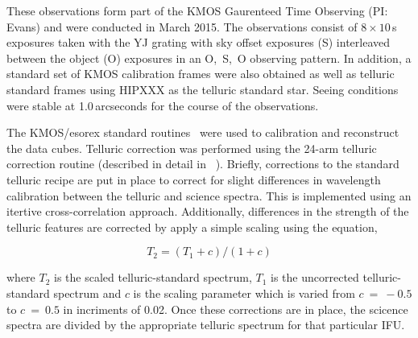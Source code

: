 \documentclass[useAMS,usenatbib]{mn2e}
\begin{document}
These observations form part of the KMOS Gaurenteed Time Observing (PI: Evans) and were conducted in March 2015.
The observations consist of $8\times10$\,s exposures taken with the YJ grating with sky offset exposures (S) interleaved between the object (O) exposures in an O,~S,~O observing pattern.
In addition, a standard set of KMOS calibration frames were also obtained as well as telluric standard frames using HIPXXX as the telluric standard star.
Seeing conditions were stable at 1.0\,arcseconds for the course of the observations.

The KMOS/esorex standard routines~\citep[SPARK;]{2013A&A...558A..56D} were used to calibration and reconstruct the data cubes.
Telluric correction was performed using the 24-arm telluric correction routine (described in detail in ~\cite{2015ApJ...803...14P}).
Briefly, corrections to the standard telluric recipe are put in place to correct for slight differences in wavelength calibration between the telluric and science spectra.
This is implemented using an itertive cross-correlation approach.
Additionally, differences in the strength of the telluric features are corrected by apply a simple scaling using the equation,

\begin{equation}
  T_{2} = (T_{1} + c) / (1 + c)
\end{equation}

\noindent where $T_{2}$ is the scaled telluric-standard spectrum, $T_{1}$ is the uncorrected telluric-standard spectrum and $c$ is the scaling parameter which is varied from $c~=~-0.5$ to $c~=~0.5$ in incriments of 0.02.
Once these corrections are in place, the scicence spectra are divided by the appropriate telluric spectrum for that particular IFU.
\end{document}
